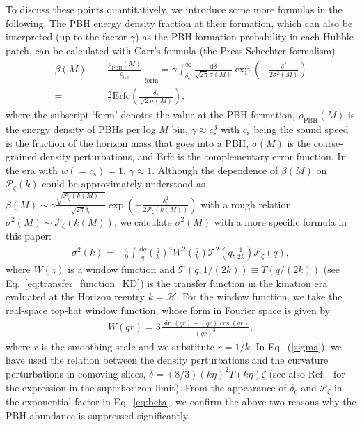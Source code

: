 \documentclass[superscriptaddress, aps, preprintnumbers,
amsmath, amssymb, sort&compress, nofootinbib, 10pt, paper, floatfix]{revtex4-2}
\newcommand{\tot}{\text{tot}}
\newcommand{\cc}{\text{c}}
\begin{document}
To discuss these points quantitatively, we introduce some more formulas in the following.  The PBH energy density fraction at their formation, which can also be interpreted (up to the factor $\gamma$) as the PBH formation probability in each Hubble patch, can be calculated with Carr's formula (the Press-Schechter formalism)~\cite{Carr:1975qj} 
\begin{align}
    \beta(M) \equiv & \left. \frac{\rho_\text{PBH}(M)}{\rho_\tot} \right|_\text{form}= \gamma \int_{\delta_\text{c}}^\infty \frac{\mathrm{d} \delta}{\sqrt{2\pi} \sigma (M)} \exp \left( - \frac{\delta^2}{2 \sigma^2 (M)} \right) \nonumber \\
    =& \frac{\gamma}{2} \mathrm{Erfc} \left( \frac{\delta_\text{c}}{\sqrt{2}\sigma(M)} \right), 
\label{eq:beta}
\end{align}
where the subscript `form' denotes the value at the PBH formation, $\rho_\text{PBH}(M)$ is the energy density of PBHs per log $M$ bin, $\gamma \approx c_\text{s}^3$ with $c_\text{s}$ being the sound speed is the fraction of the horizon mass that goes into a PBH, $\sigma(M)$ is the coarse-grained density perturbations, and Erfc is the complementary error function.  In the era with $w(=c_\text{s})=1$, $\gamma \approx 1$. 
Although the dependence of $\beta(M)$ on $\mathcal P_\zeta(k)$ could be approximately understood as $\beta(M) \sim \gamma \frac{\sqrt{\mathcal P_\zeta(k(M))}}{\sqrt{2\pi} \delta_\cc} \exp\left( - \frac{\delta_\text{c}^2}{2 \mathcal{P}_\zeta (k(M))}\right)$ with a rough relation $\sigma^2 (M) \sim \mathcal{P}_\zeta (k(M))$, we calculate $\sigma^2(M)$ with a more specific formula in this paper:
\begin{align}
    \sigma^2(k) = & \frac{4}{9} \int \frac{\mathrm{d}q}{q} \left(\frac{q}{k}\right)^4 W^2 \left( \frac{q}{k}\right) \mathcal{T}^2 \left(q, \frac{1}{2k} \right) \mathcal{P}_\zeta (q), \label{sigma}
\end{align}
where $W(z)$ is a window function and $\mathcal{T}(q, 1/(2k)) \equiv T(q/(2k))$ (see Eq.~\eqref{eq:transfer_function_KD}) is the transfer function in the kination era evaluated at the Horizon reentry $k = \mathcal{H}$. 
For the window function, we take the real-space top-hat window function, whose form in Fourier space is given by
\begin{align}
    W(q r) = 3 \frac{\sin(q r) -(qr) \cos(qr)}{(qr)^3},
    \label{eq:window}
\end{align}
where $r$ is the smoothing scale and we substitute $r = 1/k$.
In Eq.~(\ref{sigma}), we have used the relation between the density perturbations and the curvature perturbations in comoving slices, $\delta = (8/3) (k\eta)^2 T(k\eta)\zeta$ (see also Ref.~\cite{Young:2014ana} for the expression in the superhorizon limit).
From the appearance of $\delta_\text{c}$ and $\mathcal{P}_\zeta$ in the exponential factor in Eq.~\eqref{eq:beta}, we confirm the above two reasons why the PBH abundance is suppressed significantly. 
\end{document}
